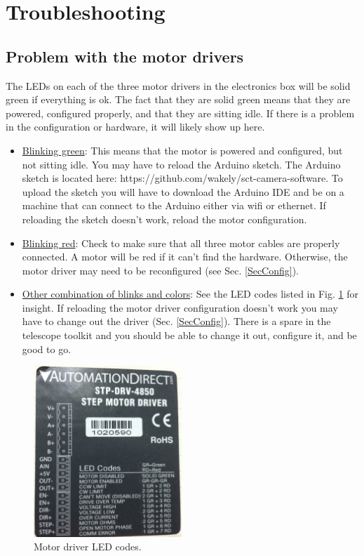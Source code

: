 \documentclass[11pt]{article}
\begin{document}
\section{Troubleshooting}

\subsection{Problem with the motor drivers}

The LEDs on each of the three motor drivers in the electronics box will be solid green if everything is ok.
The fact that they are solid green means that they are powered, configured properly, and that they are sitting idle.  
If there is a problem in the configuration or hardware, it will likely show up here.

\begin{itemize}
	\item \underline{Blinking green}:  This means that the motor is powered and configured, but not sitting idle.  
		You may have to reload the Arduino sketch.
		The Arduino sketch is located here: https://github.com/wakely/sct-camera-software.  
		To upload the sketch you will have to download the Arduino IDE and be on a machine that can connect to the Arduino either via wifi or ethernet.
		If reloading the sketch doesn't work, reload the motor configuration.
 	\item \underline{Blinking red}:  Check to make sure that all three motor cables are properly connected.  
		A motor will be red if it can't find the hardware.  Otherwise, the motor driver may need to be reconfigured (see Sec. \ref{SecConfig}).
	\item \underline{Other combination of blinks and colors}:  See the LED codes listed in Fig. \ref{ledCodes} for insight.
	 	If reloading the motor driver configuration doesn't work you may have to change out the driver (Sec. \ref{SecConfig}).  
		There is a spare in the telescope toolkit and you should be able to change it out, configure it, and be good to go.
\end{itemize}

\begin{figure}[h]
\begin{center}
\includegraphics[width = 2.2in]{photoLedCodes.JPG}
\caption{Motor driver LED codes.}  
\label{ledCodes}
\end{center}
\end{figure}
\end{document}
